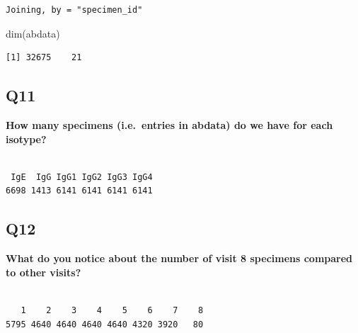 \documentclass[
  letterpaper,
  DIV=11,
  numbers=noendperiod]{scrartcl}
\newenvironment{Shaded}{\begin{snugshade}}{\end{snugshade}}
\newcommand{\FunctionTok}[1]{\textcolor[rgb]{0.28,0.35,0.67}{#1}}
\newcommand{\NormalTok}[1]{\textcolor[rgb]{0.00,0.23,0.31}{#1}}
\newcommand{\SpecialCharTok}[1]{\textcolor[rgb]{0.37,0.37,0.37}{#1}}
\begin{document}
\begin{verbatim}
Joining, by = "specimen_id"
\end{verbatim}

\begin{Shaded}
\begin{Highlighting}[]
\FunctionTok{dim}\NormalTok{(abdata)}
\end{Highlighting}
\end{Shaded}

\begin{verbatim}
[1] 32675    21
\end{verbatim}

\hypertarget{q11}{%
\subsection{Q11}\label{q11}}

\textbf{How many specimens (i.e.~entries in abdata) do we have for each
isotype?}

\begin{Shaded}
\end{Shaded}

\begin{verbatim}

 IgE  IgG IgG1 IgG2 IgG3 IgG4 
6698 1413 6141 6141 6141 6141 
\end{verbatim}

\hypertarget{q12}{%
\subsection{Q12}\label{q12}}

\textbf{What do you notice about the number of visit 8 specimens
compared to other visits?}

\begin{Shaded}
\end{Shaded}

\begin{verbatim}

   1    2    3    4    5    6    7    8 
5795 4640 4640 4640 4640 4320 3920   80 
\end{verbatim}
\end{document}
